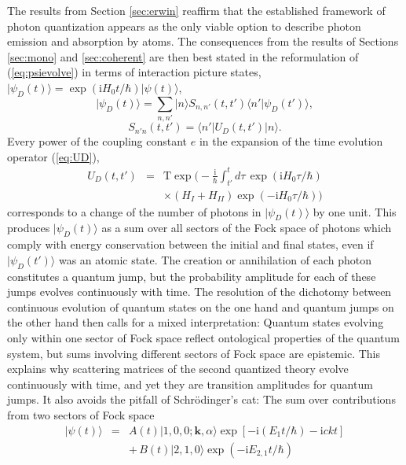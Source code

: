 \documentclass[final,3p,times,twocolumn]{elsarticle3}
\begin{document}
The results from Section \ref{sec:erwin} reaffirm that the established framework 
of photon quantization appears as the only viable option to describe photon 
emission and absorption by atoms. The consequences from the results of 
Sections \ref{sec:mono} and \ref{sec:coherent} are then best stated in the 
reformulation of (\ref{eq:psievolve}) in terms of interaction picture 
states, $\bm{|}\psi_D(t)\bm{\rangle}=\exp(\mathrm{i}H_0t/\hbar)\bm{|}\psi(t)\bm{\rangle}$,
\begin{equation}\label{eq:psievolveD}
\bm{|}\psi_D(t)\bm{\rangle}=\sum_{n,n'}\bm{|}n\bm{\rangle} S_{n,n'}(t,t')
\bm{\langle} n'\bm{|}\psi_D(t')\bm{\rangle},
\end{equation}
\[
S_{n'n}(t,t')=\bm{\langle} n'\bm{|}U_D(t,t')\bm{|}n\bm{\rangle}.
\]
Every power of the coupling constant $e$ in the expansion of the time evolution 
operator (\ref{eq:UD}),
\begin{eqnarray}\nonumber
U_D(t,t')&=&\mathrm{T}\exp\Bigg(-\frac{\mathrm{i}}{\hbar}\int_{t'}^t\!d\tau\,
\exp(\mathrm{i}H_0\tau/\hbar)
\\ \label{eq:UD2}
&&\times
(H_I+H_{II})\exp(-\mathrm{i}H_0\tau/\hbar)\Bigg)
\end{eqnarray}
corresponds to a change of the number of photons in $\bm{|}\psi_D(t)\bm{\rangle}$ by 
one unit. This produces $\bm{|}\psi_D(t)\bm{\rangle}$ as a sum over all sectors of 
the Fock space of photons which comply with energy conservation between the initial 
and final states, even if $\bm{|}\psi_D(t')\bm{\rangle}$ was an atomic state. The 
creation or annihilation of each photon constitutes a quantum jump, but the 
probability amplitude for each of these jumps evolves continuously with time.
The resolution of the dichotomy between continuous evolution of quantum states
on the one hand and quantum jumps on the other hand then calls for a mixed
interpretation: Quantum states evolving only within one sector of Fock space
reflect ontological properties of the quantum system, but sums involving different 
sectors of Fock space are epistemic. This explains why scattering matrices of the 
second quantized theory evolve continuously with time, and yet they are transition 
amplitudes for quantum jumps. It also avoids the pitfall of Schr\"odinger's cat:
The sum over contributions from two sectors of Fock space
\begin{eqnarray}\nonumber
\bm{|}\psi(t)\bm{\rangle}&=&A(t)\bm{|}1,0,0;\bm{k},\alpha\bm{\rangle}
\exp[-\mathrm{i}(E_{1}t/\hbar)-\mathrm{i}ckt]
\\ \label{eq:psi2}
&&+\,B(t)\bm{|}2,1,0\bm{\rangle}\exp(-\mathrm{i}E_{2,1}t/\hbar)
\end{eqnarray}
\end{document}
